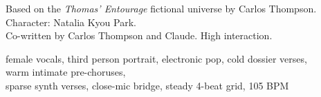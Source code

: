 

\begin{notes}
Based on the \emph{Thomas’ Entourage} fictional universe by Carlos Thompson.\\
Character: Natalia Kyou Park.\\
Co-written by Carlos Thompson and Claude. %
High interaction.
\end{notes}

\begin{style}
female vocals, third person portrait, electronic pop, cold dossier verses,\\
warm intimate pre-choruses,\\
sparse synth verses, close-mic bridge, steady 4-beat grid, 105 BPM
\end{style}

